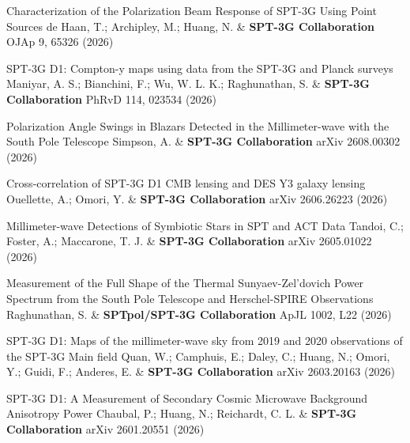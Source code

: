 \begin{etaremune}[topsep=0pt,itemsep=0pt,partopsep=0pt,parsep=0pt]
            {Characterization of the Polarization Beam Response of SPT-3G Using Point Sources}
            {de Haan, T.; Archipley, M.; Huang, N. \& \textbf{SPT-3G Collaboration}}
            {OJAp 9, 65326 (2026)}

            {SPT-3G D1: Compton-y maps using data from the SPT-3G and Planck surveys}
            {Maniyar, A. S.; Bianchini, F.; Wu, W. L. K.; Raghunathan, S. \& \textbf{SPT-3G Collaboration}}
            {PhRvD 114, 023534 (2026)}

            {Polarization Angle Swings in Blazars Detected in the Millimeter-wave with the South Pole Telescope}
            {Simpson, A. \& \textbf{SPT-3G Collaboration}}
            {arXiv 2608.00302 (2026)}

            {Cross-correlation of SPT-3G D1 CMB lensing and DES Y3 galaxy lensing}
            {Ouellette, A.; Omori, Y. \& \textbf{SPT-3G Collaboration}}
            {arXiv 2606.26223 (2026)}

            {Millimeter-wave Detections of Symbiotic Stars in SPT and ACT Data}
            {Tandoi, C.; Foster, A.; Maccarone, T. J. \& \textbf{SPT-3G Collaboration}}
            {arXiv 2605.01022 (2026)}

            {Measurement of the Full Shape of the Thermal Sunyaev-Zel'dovich Power Spectrum from the South Pole Telescope and Herschel-SPIRE Observations}
            {Raghunathan, S. \& \textbf{SPTpol/SPT-3G Collaboration}}
            {ApJL 1002, L22 (2026)}

            {SPT-3G D1: Maps of the millimeter-wave sky from 2019 and 2020 observations of the SPT-3G Main field}
            {Quan, W.; Camphuis, E.; Daley, C.; Huang, N.; Omori, Y.; Guidi, F.; Anderes, E. \& \textbf{SPT-3G Collaboration}}
            {arXiv 2603.20163 (2026)}

            {SPT-3G D1: A Measurement of Secondary Cosmic Microwave Background Anisotropy Power}
            {Chaubal, P.; Huang, N.; Reichardt, C. L. \& \textbf{SPT-3G Collaboration}}
            {arXiv 2601.20551 (2026)}


\end{etaremune}
